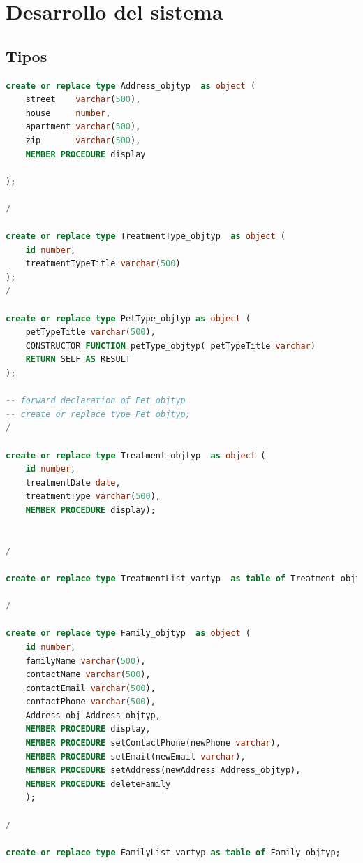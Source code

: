 \documentclass{FR16}
\begin{document}
\section{Desarrollo del sistema}

\subsection{Tipos}

\begin{lstlisting}[language=Sql, basicstyle=\scriptsize]
create or replace type Address_objtyp  as object (
    street    varchar(500),
    house     number,
    apartment varchar(500),
    zip       varchar(500),
    MEMBER PROCEDURE display
    
);

/

create or replace type TreatmentType_objtyp  as object (
    id number,
    treatmentTypeTitle varchar(500)
);
/

create or replace type PetType_objtyp as object (
    petTypeTitle varchar(500),
    CONSTRUCTOR FUNCTION petType_objtyp( petTypeTitle varchar)
    RETURN SELF AS RESULT
);

-- forward declaration of Pet_objtyp
-- create or replace type Pet_objtyp;
/

create or replace type Treatment_objtyp  as object (
    id number,
    treatmentDate date,
    treatmentType varchar(500),
    MEMBER PROCEDURE display);


/

create or replace type TreatmentList_vartyp  as table of Treatment_objtyp;

/

create or replace type Family_objtyp  as object (
    id number,
    familyName varchar(500),
    contactName varchar(500),
    contactEmail varchar(500),
    contactPhone varchar(500),
    Address_obj Address_objtyp,
    MEMBER PROCEDURE display,
    MEMBER PROCEDURE setContactPhone(newPhone varchar),
    MEMBER PROCEDURE setEmail(newEmail varchar),
    MEMBER PROCEDURE setAddress(newAddress Address_objtyp),
    MEMBER PROCEDURE deleteFamily
    );

/

create or replace type FamilyList_vartyp as table of Family_objtyp;


\end{lstlisting}
\end{document}
